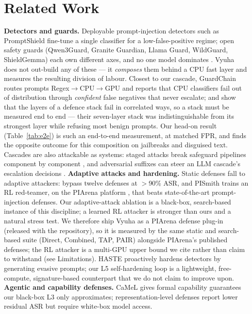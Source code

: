 \documentclass[11pt]{article}
\begin{document}
\section{Related Work}
\textbf{Detectors and guards.} Deployable prompt-injection detectors such as PromptShield
\citep{promptshield} fine-tune a single classifier for a low-false-positive regime; open safety guards
(Qwen3Guard, Granite Guardian, Llama Guard, WildGuard, ShieldGemma) each own different axes, and no one
model dominates \citep{guard-bench}. Vyuha does not out-build any of these --- it \emph{composes} them
behind a CPU fast layer and measures the resulting division of labour. Closest to our cascade,
GuardChain \citep{guardchain} routes prompts Regex$\rightarrow$CPU$\rightarrow$GPU and reports that CPU
classifiers fail out of distribution through \emph{confident} false negatives that never escalate; and
\citet{layered-ensemble} show that the layers of a defence stack fail in correlated ways, so a stack must
be measured end to end --- their seven-layer stack was indistinguishable from its strongest layer while
refusing most benign prompts. Our head-on result (Table~\ref{tab:e2e}) is such an end-to-end measurement,
at matched FPR, and finds the opposite outcome for this composition on jailbreaks and disguised text.
Cascades are also attackable as systems: staged attacks break safeguard pipelines component by component
\citep{stack}, and adversarial suffixes can steer an LLM cascade's escalation decisions \citep{cascade-attack}.
\textbf{Adaptive attacks and hardening.} Static defenses fall to adaptive attackers:
\citet{attacker-second} bypass twelve defenses at $>$90\% ASR, and PISmith \citep{pismith} trains an
RL red-teamer, on the PIArena platform \citep{piarena}, that beats state-of-the-art prompt-injection
defenses. Our adaptive-attack ablation is a black-box, search-based instance of this discipline; a
learned RL attacker is stronger than ours and a natural stress test. We therefore ship Vyuha as a
PIArena defense plug-in (released with the repository), so it is measured by the same static and search-based suite
(Direct, Combined, TAP, PAIR) alongside PIArena's published defenses; the RL attacker is a multi-GPU
upper bound we cite rather than claim to withstand (see Limitations). HASTE \citep{haste} proactively hardens detectors by generating
evasive prompts; our L5 self-hardening loop is a lightweight, free-compute, signature-based counterpart
that we do not claim to improve upon.
\textbf{Agentic and capability defenses.} CaMeL \citep{camel} gives formal capability guarantees our
black-box L3 only approximates; representation-level defenses report lower residual ASR but require
white-box model access.
\end{document}

